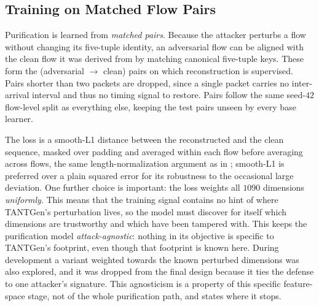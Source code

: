\subsection{Training on Matched Flow Pairs}\label{subsec:sol-rec-training}
Purification is learned from \emph{matched pairs}. Because the attacker perturbs a flow
without changing its five-tuple identity, an adversarial flow can be aligned with the
clean flow it was derived from by matching canonical five-tuple keys. These form the (adversarial
$\rightarrow$ clean) pairs on which reconstruction is supervised. Pairs shorter than two packets are dropped,
since a single packet carries no inter-arrival interval and thus no timing signal to
restore. Pairs follow the same seed-$42$ flow-level split as everything else, keeping
the test pairs unseen by every base learner.

The loss is a smooth-L1 distance between the reconstructed and the clean sequence,
masked over padding and averaged within each flow before averaging across flows, the
same length-normalization argument as in ; smooth-L1 is preferred
over a plain squared error for its robustness to the occasional large deviation.
One further choice is important: the loss weights all $1090$ dimensions
\emph{uniformly}. This means that the training signal contains no hint of where TANTGen's perturbation
lives, so the model must discover for itself which dimensions are trustworthy and
which have been tampered with. This keeps the purification model
\emph{attack-agnostic}: nothing in its objective is specific to TANTGen's footprint, even
though that footprint is known here. During development a variant
weighted towards the known perturbed dimensions was also explored, and it was dropped
from the final design because it ties the defense to one attacker's
signature. This agnosticism is a property of this specific feature-space stage, not of the whole
purification path, and  states where it stops.

